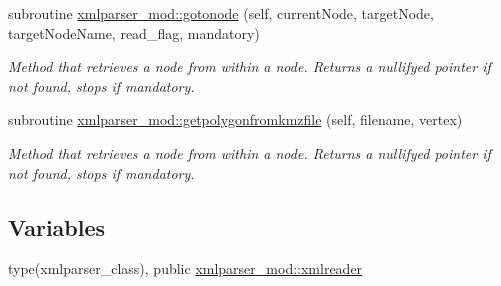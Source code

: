 \begin{DoxyCompactItemize}
subroutine \mbox{\hyperlink{namespacexmlparser__mod_acd860c3d06a25fc422edbcc3d356d976}{xmlparser\+\_\+mod\+::gotonode}} (self, current\+Node, target\+Node, target\+Node\+Name, read\+\_\+flag, mandatory)
\begin{DoxyCompactList}\small\item\em Method that retrieves a node from within a node. Returns a nullifyed pointer if not found, stops if mandatory. \end{DoxyCompactList}\item 
subroutine \mbox{\hyperlink{namespacexmlparser__mod_aa62d7fce2037454ba8fad993c6f1c8fd}{xmlparser\+\_\+mod\+::getpolygonfromkmzfile}} (self, filename, vertex)
\begin{DoxyCompactList}\small\item\em Method that retrieves a node from within a node. Returns a nullifyed pointer if not found, stops if mandatory. \end{DoxyCompactList}\end{DoxyCompactItemize}
\subsection*{Variables}
\begin{DoxyCompactItemize}
\item 
type(xmlparser\+\_\+class), public \mbox{\hyperlink{namespacexmlparser__mod_a482bd93d0a4ba8c9c2000713a4b14799}{xmlparser\+\_\+mod\+::xmlreader}}
\end{DoxyCompactItemize}
